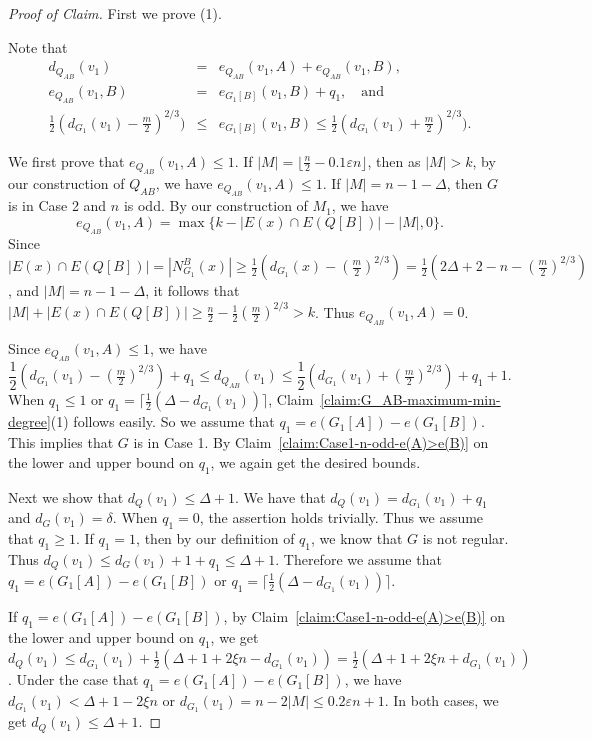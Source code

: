 \documentclass[11pt, oneside]{article}
\newcommand{\ve}{\varepsilon}
\newenvironment{proofc}{\begin{proof}[Proof of Claim]}{\end{proof}}
\begin{document}
\begin{proofc} First we prove (1). 
 
Note that 
\begin{eqnarray*}
    d_{Q_{AB}} (v_1) &=&e_{Q_{AB}}(v_1,A) +e_{Q_{AB}}(v_1,B),  \\
    e_{Q_{AB}}(v_1,B) &=&e_{G_1[B]}(v_1,B)+q_1,  \quad \text{and} \\
   \frac{1}{2}(d_{G_1}(v_1)-\tfrac{m}{2})^{2/3}) &\le& e_{G_1[B]}(v_1,B) \le \frac{1}{2}(d_{G_1}(v_1)+\tfrac{m}{2})^{2/3}). 
\end{eqnarray*}

We first prove that $e_{Q_{AB}}(v_1,A) \le 1$. 
If  $|M| =\lfloor \frac{n}{2} -0.1\ve n \rfloor$, then as $|M|>k$, by our construction of $Q_{AB}$, we have 
$e_{Q_{AB}}(v_1,A) \le 1$.  
If $|M| = n-1-\Delta$, then $G$ is in Case 2 and $n$ is odd. By our construction of $M_1$, we have 
$$
e_{Q_{AB}}(v_1,A)  =  \max\{k -|E(x) \cap E(Q[B])| - |M|, 0 \}. 
$$
 Since  $|E(x) \cap E(Q[B])| =|N^B_{G_1}(x)| \ge \frac{1}{2}(d_{G_1}(x)-(\tfrac{m}{2})^{2/3}) = \frac{1}{2} (2\Delta+2- n -(\tfrac{m}{2})^{2/3})$, and $|M| =n-1-\Delta$, it follows that  $|M|+|E(x) \cap E(Q[B])| 
 \ge  \frac{n}{2}- \frac{1}{2}(\tfrac{m}{2})^{2/3}>k$. 
 Thus $e_{Q_{AB}}(v_1,A)  =0$. 

Since $e_{Q_{AB}}(v_1,A) \le 1$, we have 
$$
 \frac{1}{2}(d_{G_1}(v_1)-(\tfrac{m}{2})^{2/3})+q_1 \le d_{Q_{AB}} (v_1) \le \frac{1}{2}(d_{G_1}(v_1)+(\tfrac{m}{2})^{2/3}) +q_1 +1.
 $$
When $q_1 \le 1$ or $q_1 = \lceil \frac{1}{2}(\Delta - d_{G_1}(v_1)) \rceil$, 
Claim~\ref{claim:G_AB-maximum-min-degree}(1) follows 
easily. So we assume that  $q_1=e(G_1[A])-e(G_1[B])$. 
This implies that $G$ is in Case 1. By Claim~\ref{claim:Case1-n-odd-e(A)>e(B)} on the lower and upper bound on $q_1$, we again get the desired bounds. 

Next we show that $d_Q(v_1) \le \Delta+1$. We have that $d_Q(v_1) =d_{G_1}(v_1)+q_1$ and $d_{G}(v_1) =\delta$. When $q_1=0$,  the assertion holds trivially. 
Thus we assume that $q_1\ge 1$. If $q_1=1$, then by our definition of $q_1$, we know that $G$ is not regular. 
Thus $d_Q(v_1)  \le d_{G}(v_1)+1+q_1 \le \Delta+1$. 
Therefore we assume that $q_1=e(G_1[A]) -e(G_1[B])$ 
or $q_1= \lceil \frac{1}{2}(\Delta -d_{G_1}(v_1)) \rceil$.

If $q_1=e(G_1[A]) -e(G_1[B])$, by 
 Claim~\ref{claim:Case1-n-odd-e(A)>e(B)} on the lower and upper bound on $q_1$, we get 
 $d_Q(v_1)  \le d_{G_1}(v_1) + \frac{1}{2}(\Delta+1+2\xi n -d_{G_1}(v_1))  =\frac{1}{2}(\Delta+1+2\xi n+d_{G_1}(v_1))$.   Under the case that $q_1=e(G_1[A]) -e(G_1[B])$,
 we have $d_{G_1}(v_1) < \Delta+1-2\xi n$ or $d_{G_1}(v_1) =n-2|M| \le 0.2 \ve n+1$. In both cases, we get $d_Q(v_1)  \le  \Delta+1$. 
 

\end{proofc}
\end{document}
